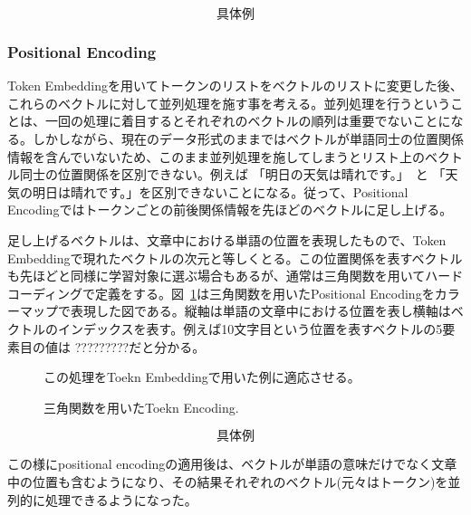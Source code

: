 
\begin{equation*}
  \text{具体例}
\end{equation*}


\subsubsection{Positional Encoding}
Token Embeddingを用いてトークンのリストをベクトルのリストに変更した後、これらのベクトルに対して並列処理を施す事を考える。並列処理を行うということは、一回の処理に着目するとそれぞれのベクトルの順列は重要でないことになる。しかしながら、現在のデータ形式のままではベクトルが単語同士の位置関係情報を含んでいないため、このまま並列処理を施してしまうとリスト上のベクトル同士の位置関係を区別できない。例えば 「明日の天気は晴れです。」　と 「天気の明日は晴れです。」を区別できないことになる。従って、Positional Encodingではトークンごとの前後関係情報を先ほどのベクトルに足し上げる。

足し上げるベクトルは、文章中における単語の位置を表現したもので、Token Embeddingで現れたベクトルの次元と等しくとる。この位置関係を表すベクトルも先ほどと同様に学習対象に選ぶ場合もあるが、通常は三角関数を用いてハードコーディングで定義をする。図~\ref{fig:tri-pos-encoding}は三角関数を用いたPositional Encodingをカラーマップで表現した図である。縦軸は単語の文章中における位置を表し横軸はベクトルのインデックスを表す。例えば10文字目という位置を表すベクトルの5要素目の値は ?????????だと分かる。
\begin{figure}
  \centering

  \caption{三角関数を用いたToekn Encoding.}
\label{fig:tri-pos-encoding}

この処理をToekn Embeddingで用いた例に適応させる。
\end{figure}

\begin{equation*}
  \text{具体例}
\end{equation*}

この様にpositional encodingの適用後は、ベクトルが単語の意味だけでなく文章中の位置も含むようになり、その結果それぞれのベクトル(元々はトークン)を並列的に処理できるようになった。



